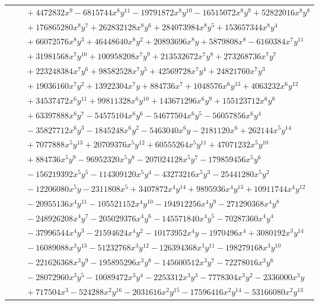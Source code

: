\documentclass[11pt]{article}
\begin{document}
\begin{longtable}{@{}ll@{}}
 & $\quad +4472832x^{9}-6815744x^{8}y^{11}-19791872x^{8}y^{10}-16515072x^{8}y^{9}+52822016x^{8}y^{8}$\\
 & $\quad +176865280x^{8}y^{7}+262832128x^{8}y^{6}+284073984x^{8}y^{5}+153657344x^{8}y^{4}$\\
 & $\quad +66072576x^{8}y^{3}+46448640x^{8}y^{2}+20893696x^{8}y+5879808x^{8}-6160384x^{7}y^{11}$\\
 & $\quad +31981568x^{7}y^{10}+100958208x^{7}y^{9}+213532672x^{7}y^{8}+273268736x^{7}y^{7}$\\
 & $\quad +223248384x^{7}y^{6}+98582528x^{7}y^{5}+42569728x^{7}y^{4}+24821760x^{7}y^{3}$\\
 & $\quad +19036160x^{7}y^{2}+13922304x^{7}y+884736x^{7}+1048576x^{6}y^{13}+4063232x^{6}y^{12}$\\
 & $\quad +34537472x^{6}y^{11}+99811328x^{6}y^{10}+143671296x^{6}y^{9}+155123712x^{6}y^{8}$\\
 & $\quad +63397888x^{6}y^{7}-54575104x^{6}y^{6}-54677504x^{6}y^{5}-56057856x^{6}y^{4}$\\
 & $\quad -35827712x^{6}y^{3}-1845248x^{6}y^{2}-5463040x^{6}y-2181120x^{6}+262144x^{5}y^{14}$\\
 & $\quad +7077888x^{5}y^{13}+20709376x^{5}y^{12}+60555264x^{5}y^{11}+47071232x^{5}y^{10}$\\
 & $\quad +884736x^{5}y^{9}-96952320x^{5}y^{8}-207024128x^{5}y^{7}-179859456x^{5}y^{6}$\\
 & $\quad -156219392x^{5}y^{5}-114309120x^{5}y^{4}-43273216x^{5}y^{3}-25441280x^{5}y^{2}$\\
 & $\quad -12206080x^{5}y-2311808x^{5}+3407872x^{4}y^{14}+9895936x^{4}y^{13}+10911744x^{4}y^{12}$\\
 & $\quad -20955136x^{4}y^{11}-105521152x^{4}y^{10}-194912256x^{4}y^{9}-271290368x^{4}y^{8}$\\
 & $\quad -248926208x^{4}y^{7}-205029376x^{4}y^{6}-145571840x^{4}y^{5}-70287360x^{4}y^{4}$\\
 & $\quad -37996544x^{4}y^{3}-21594624x^{4}y^{2}-10173952x^{4}y-1970496x^{4}+3080192x^{3}y^{14}$\\
 & $\quad -16089088x^{3}y^{13}-51232768x^{3}y^{12}-126394368x^{3}y^{11}-198279168x^{3}y^{10}$\\
 & $\quad -221626368x^{3}y^{9}-195895296x^{3}y^{8}-145600512x^{3}y^{7}-72278016x^{3}y^{6}$\\
 & $\quad -28072960x^{3}y^{5}-10089472x^{3}y^{4}-2253312x^{3}y^{3}-7778304x^{3}y^{2}-2336000x^{3}y$\\
 & $\quad +717504x^{3}-524288x^{2}y^{16}-2031616x^{2}y^{15}-17596416x^{2}y^{14}-53166080x^{2}y^{13}$\\

\end{longtable}
\end{document}
